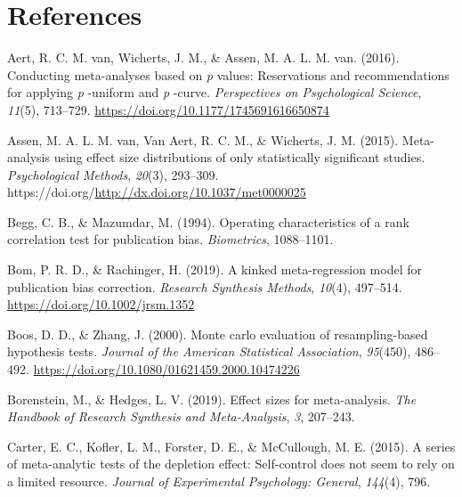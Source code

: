 \documentclass[
  man, donotrepeattitle,floatsintext]{apa7}
\newlength{\cslhangindent}
\newenvironment{CSLReferences}[2] %
 {\begin{list}{}{%
  \setlength{\itemindent}{0pt}
  \setlength{\leftmargin}{0pt}
  \setlength{\parsep}{0pt}
  \ifodd #1
   \setlength{\leftmargin}{\cslhangindent}
   \setlength{\itemindent}{-1\cslhangindent}
  \fi
  \setlength{\itemsep}{#2\baselineskip}}}
 {\end{list}}
\begin{document}
\newpage

\section*{References}\label{references}

\begingroup
\setlength{\parindent}{-0.5in}

\label{refs}
\begin{CSLReferences}{1}{0}
Aert, R. C. M. van, Wicherts, J. M., \& Assen, M. A. L. M. van. (2016). Conducting meta-analyses based on \emph{p} values: Reservations and recommendations for applying \emph{p} -uniform and \emph{p} -curve. \emph{Perspectives on Psychological Science}, \emph{11}(5), 713--729. \url{https://doi.org/10.1177/1745691616650874}

Assen, M. A. L. M. van, Van Aert, R. C. M., \& Wicherts, J. M. (2015). {Meta-analysis using effect size distributions of only statistically significant studies}. \emph{Psychological Methods}, \emph{20}(3), 293--309. https://doi.org/\url{http://dx.doi.org/10.1037/met0000025}

Begg, C. B., \& Mazumdar, M. (1994). Operating characteristics of a rank correlation test for publication bias. \emph{Biometrics}, 1088--1101.

Bom, P. R. D., \& Rachinger, H. (2019). A kinked meta-regression model for publication bias correction. \emph{Research Synthesis Methods}, \emph{10}(4), 497--514. \url{https://doi.org/10.1002/jrsm.1352}

Boos, D. D., \& Zhang, J. (2000). Monte carlo evaluation of resampling-based hypothesis tests. \emph{Journal of the American Statistical Association}, \emph{95}(450), 486--492. \url{https://doi.org/10.1080/01621459.2000.10474226}

Borenstein, M., \& Hedges, L. V. (2019). Effect sizes for meta-analysis. \emph{The Handbook of Research Synthesis and Meta-Analysis}, \emph{3}, 207--243.

Carter, E. C., Kofler, L. M., Forster, D. E., \& McCullough, M. E. (2015). A series of meta-analytic tests of the depletion effect: Self-control does not seem to rely on a limited resource. \emph{Journal of Experimental Psychology: General}, \emph{144}(4), 796.


\end{CSLReferences}
\end{document}
